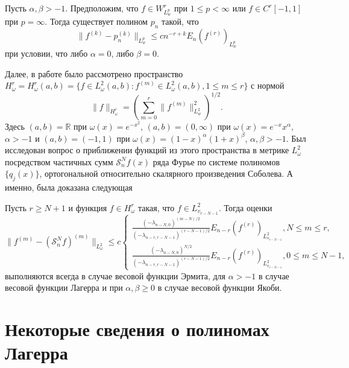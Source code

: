 \begin{theoremA}
	Пусть $\alpha,\beta>-1$. Предположим, что $f\in W^r_{L^p_w}$ при $1\le p<\infty$ или $f\in C^r[-1,1]$ при $p=\infty$. Тогда существует полином $p_n$ такой, что
	$$
	\|f^{(k)}-p_n^{(k)}\|_{L^p_w}\le c n^{-r+k}E_n(f^{(r)})_{L^p_w}
	$$
	при условии, что либо $\alpha=0$, либо $\beta=0$.
\end{theoremA}

Далее, в работе \cite{Approx-Juan} было рассмотрено пространство $H^r_\omega=H^r_\omega(a,b)=\{f\in L^2_\omega(a,b): f^{(m)}\in L^2_\omega(a,b), 1\le m\le r\}$ с нормой
$$
\|f\|_{H^r_\omega}=\left(\sum_{m=0}^{r}\|f^{(m)}\|^2_{L^2_w}\right)^{1/2}.
$$
Здесь $(a, b)=\mathbb{R}$ при $\omega(x)=e^{-x^2}$, $(a,b)=(0, \infty)$ при $\omega(x)=e^{-x}x^\alpha$, $\alpha>-1$ и $(a,b)=(-1, 1)$ при $\omega(x)=(1-x)^\alpha(1+x)^\beta$, $\alpha, \beta>-1$.
Был исследован вопрос о приближении функций из этого пространства в метрике $L^2_\omega$ посредством частичных сумм $\mathcal{S}_n^Nf(x)$ ряда Фурье по системе полиномов $\{q_j(x)\}$, ортогональной относительно скалярного произведения Соболева. А именно, была доказана следующая

\begin{theoremA}
	Пусть $r\ge N+1$ и функция $f\in H^r_\omega$ такая, что $f\in L^2_{v_{r-N-1}}$. Тогда оценки
	$$
	\|f^{(m)}-(\mathcal{S}_n^Nf)^{(m)}\|_{L^2_\omega}\le c
	\begin{cases}
	\frac{(-\lambda_{n-N,0})^{(m-N)/2}}{(-\lambda_{n-r,r-N-1})^{(r-N-1)/2}}E_{n-r}(f^{(r)})_{L^2_{v_{r-N-1}}}, N\le m\le r, \\
	\frac{(-\lambda_{n-N,0})^{N/2}}{(-\lambda_{n-r,r-N-1})^{(r-N-1)/2}}E_{n-r}(f^{(r)})_{L^2_{v_{r-N-1}}}, 0\le m\le N-1,
	\end{cases}
	$$
	выполняются всегда в случае весовой функции Эрмита, для $\alpha>-1$ в случае весовой функции Лагерра и при $\alpha, \beta\ge0$ в случае весовой функции Якоби.
\end{theoremA}

\section{Некоторые сведения о полиномах Лагерра}

